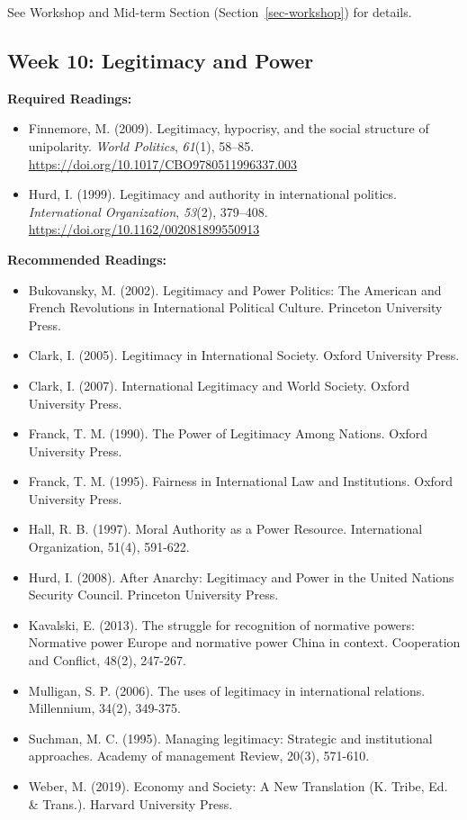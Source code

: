 \documentclass[
  letterpaper,
  DIV=11,
  numbers=noendperiod]{scrartcl}
\providecommand{\tightlist}{%
  \setlength{\itemsep}{0pt}\setlength{\parskip}{0pt}}\usepackage{longtable,booktabs,array}
\begin{document}
See Workshop and Mid-term Section (Section~\ref{sec-workshop}) for
details.

\hypertarget{week-10-legitimacy-and-power}{%
\subsection*{Week 10: Legitimacy and
Power}\label{week-10-legitimacy-and-power}}

\textbf{Required Readings:}

\begin{itemize}
\tightlist
\item
  Finnemore, M. (2009). Legitimacy, hypocrisy, and the social structure
  of unipolarity. \emph{World Politics}, \emph{61}(1), 58--85.
  \url{https://doi.org/10.1017/CBO9780511996337.003}
\item
  Hurd, I. (1999). Legitimacy and authority in international politics.
  \emph{International Organization}, \emph{53}(2), 379--408.
  \url{https://doi.org/10.1162/002081899550913}
\end{itemize}

\textbf{Recommended Readings:}

\begin{itemize}
\tightlist
\item
  Bukovansky, M. (2002). Legitimacy and Power Politics: The American and
  French Revolutions in International Political Culture. Princeton
  University Press.
\item
  Clark, I. (2005). Legitimacy in International Society. Oxford
  University Press.
\item
  Clark, I. (2007). International Legitimacy and World Society. Oxford
  University Press.
\item
  Franck, T. M. (1990). The Power of Legitimacy Among Nations. Oxford
  University Press.
\item
  Franck, T. M. (1995). Fairness in International Law and Institutions.
  Oxford University Press.
\item
  Hall, R. B. (1997). Moral Authority as a Power Resource. International
  Organization, 51(4), 591-622.
\item
  Hurd, I. (2008). After Anarchy: Legitimacy and Power in the United
  Nations Security Council. Princeton University Press.
\item
  Kavalski, E. (2013). The struggle for recognition of normative powers:
  Normative power Europe and normative power China in context.
  Cooperation and Conflict, 48(2), 247-267.
\item
  Mulligan, S. P. (2006). The uses of legitimacy in international
  relations. Millennium, 34(2), 349-375.
\item
  Suchman, M. C. (1995). Managing legitimacy: Strategic and
  institutional approaches. Academy of management Review, 20(3),
  571-610.
\item
  Weber, M. (2019). Economy and Society: A New Translation (K. Tribe,
  Ed. \& Trans.). Harvard University Press.
\end{itemize}
\end{document}
